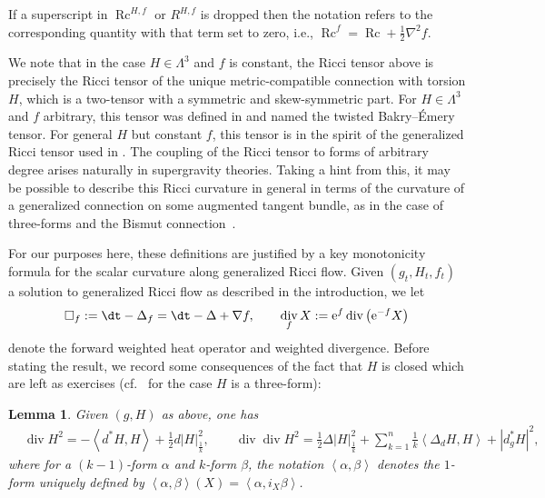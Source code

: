 \documentclass[pdftex]{sigma}
\numberwithin{equation}{section}
\newtheorem{Lemma}[thm]{Lemma}
\newcommand{\brs}[1]{\left| #1 \right|}
\newcommand{\gD}{\Delta}
\newcommand{\ga}{\alpha}
\newcommand{\gb}{\beta}
\newcommand{\N}{\nabla}
\newcommand{\IP}[1]{\left<#1\right>}
\newcommand{\wnorm}[1]{\left|#1\right|^2_{\frac1k}}
\DeclareMathOperator{\Rc}{Rc}
\DeclareMathOperator{\divg}{div}
\begin{document}
\begin{rmk} If a superscript in $\Rc^{H,f}$ or $R^{H,f}$ is dropped then the notation refers to the corresponding quantity with that term set to zero, i.e., $\Rc^f = \Rc + \frac{1}{2} \N^2 f$.
\end{rmk}

We note that in the case $H \in \Lambda^3$ and $f$ is constant, the Ricci tensor above is precisely the Ricci tensor of the unique metric-compatible connection with torsion $H$, which is a two-tensor with a symmetric and skew-symmetric part. For $H \in \Lambda^3$ and $f$ arbitrary, this tensor was defined in \cite{Streetsscalar} and named the twisted Bakry--\'Emery tensor. For general $H$ but constant $f$, this tensor is in the spirit of the generalized Ricci tensor used in \cite{FNS}. The coupling of the Ricci tensor to forms of arbitrary degree arises naturally in supergravity theories. Taking a hint from this, it may be possible to describe this Ricci curvature in general in terms of the curvature of a generalized connection on some augmented tangent bundle, as in the case of three-forms and the Bismut connection~\cite{GRFbook}.

For our purposes here, these definitions are justified by a key monotonicity formula for the scalar curvature along generalized Ricci flow. Given $(g_t, H_t, f_t)$ a solution to generalized Ricci flow as described in the introduction, we let
\begin{align*}
\square_f := \dt - \gD_f = \dt - \gD + \N f, \qquad \divg_f X := {\rm e}^{f} \divg \big({\rm e}^{-f} X\big)
\end{align*}
denote the forward weighted heat operator and weighted divergence. Before stating the result, we record some consequences of the fact that $H$ is closed which are left as exercises (cf.\ \cite[Lemma~3.19]{GRFbook} for the case $H$ is a three-form):
\begin{Lemma} \label{l:HBianchi} Given $(g, H)$ as above, one has
\begin{align*}
& \divg H^2 = - \IP{d^* H, H} + \frac{1}{2} d \wnorm{H},\qquad
 \divg \divg H^2 = \frac{1}{2} \gD \wnorm{H} + \sum_{k=1}^n \frac{1}{k} \IP{\gD_d H, H} + \brs{d^*_g H}^2,
\end{align*}
where for a $(k-1)$-form $\ga$ and $k$-form $\gb$, the notation $\IP{\ga, \gb}$ denotes the $1$-form uniquely defined by $\IP{\ga,\gb}(X) = \IP{\ga, i_X \gb}$.
\end{Lemma}
\end{document}
